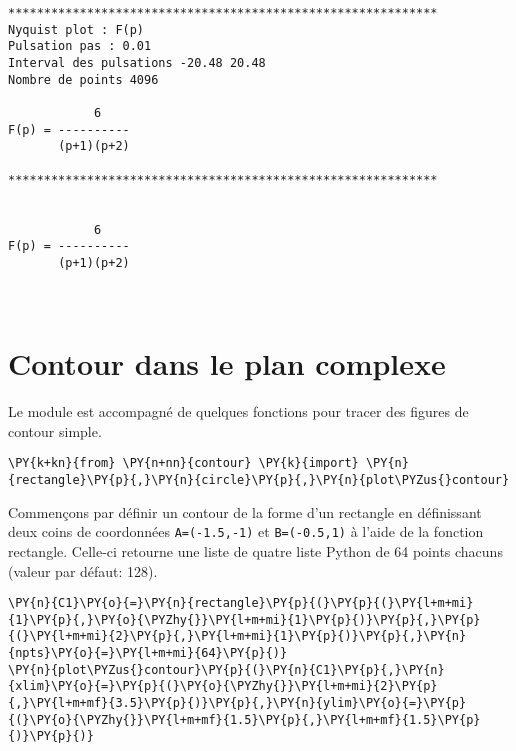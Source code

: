     \begin{Verbatim}[commandchars=\\\{\}]
************************************************************
Nyquist plot : F(p)
Pulsation pas : 0.01
Interval des pulsations -20.48 20.48
Nombre de points 4096

            6
F(p) = ----------
       (p+1)(p+2)

************************************************************


            6
F(p) = ----------
       (p+1)(p+2)

    \end{Verbatim}

    \begin{center}
    \end{center}
    { \hspace*{\fill} \\}
    
    \hypertarget{contour-dans-le-plan-complexe}{%
\section{Contour dans le plan
complexe}\label{contour-dans-le-plan-complexe}}

Le module est accompagné de quelques fonctions pour tracer des figures
de contour simple.

    \begin{tcolorbox}[breakable, size=fbox, boxrule=1pt, pad at break*=1mm,colback=cellbackground, colframe=cellborder]
\begin{Verbatim}[commandchars=\\\{\}]
\PY{k+kn}{from} \PY{n+nn}{contour} \PY{k}{import} \PY{n}{rectangle}\PY{p}{,}\PY{n}{circle}\PY{p}{,}\PY{n}{plot\PYZus{}contour}
\end{Verbatim}
\end{tcolorbox}

    Commençons par définir un contour de la forme d'un rectangle en
définissant deux coins de coordonnées \texttt{A=(-1.5,-1)} et
\texttt{B=(-0.5,1)} à l'aide de la fonction rectangle. Celle-ci retourne
une liste de quatre liste Python de 64 points chacuns (valeur par
défaut: 128).

    \begin{tcolorbox}[breakable, size=fbox, boxrule=1pt, pad at break*=1mm,colback=cellbackground, colframe=cellborder]
\begin{Verbatim}[commandchars=\\\{\}]
\PY{n}{C1}\PY{o}{=}\PY{n}{rectangle}\PY{p}{(}\PY{p}{(}\PY{l+m+mi}{1}\PY{p}{,}\PY{o}{\PYZhy{}}\PY{l+m+mi}{1}\PY{p}{)}\PY{p}{,}\PY{p}{(}\PY{l+m+mi}{2}\PY{p}{,}\PY{l+m+mi}{1}\PY{p}{)}\PY{p}{,}\PY{n}{npts}\PY{o}{=}\PY{l+m+mi}{64}\PY{p}{)}
\PY{n}{plot\PYZus{}contour}\PY{p}{(}\PY{n}{C1}\PY{p}{,}\PY{n}{xlim}\PY{o}{=}\PY{p}{(}\PY{o}{\PYZhy{}}\PY{l+m+mi}{2}\PY{p}{,}\PY{l+m+mf}{3.5}\PY{p}{)}\PY{p}{,}\PY{n}{ylim}\PY{o}{=}\PY{p}{(}\PY{o}{\PYZhy{}}\PY{l+m+mf}{1.5}\PY{p}{,}\PY{l+m+mf}{1.5}\PY{p}{)}\PY{p}{)}
\end{Verbatim}
\end{tcolorbox}

